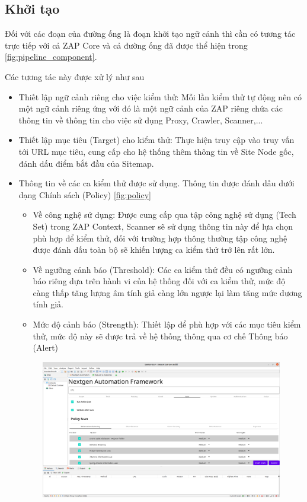 \documentclass[./../main.tex]{subfiles}
\begin{document}
\subsection{Khởi tạo}

Đối với các đoạn của đường ống là đoạn khởi tạo ngữ cảnh thì cần có tương
tác trực tiếp với cả ZAP Core và cả đường ống đã được thể hiện trong \ref{fig:pipeline_component}.

Các tương tác này được xử lý như sau
\begin{itemize}
	\item Thiết lập ngữ cảnh riêng cho việc kiểm thử: Mỗi lần kiểm
	      thử tự động nên có một ngữ cảnh riêng ứng với đó là một ngữ cảnh
	      của ZAP riêng chứa các thông tin về thông tin cho việc sử dụng
	      Proxy, Crawler, Scanner,...
	\item Thiết lập mục tiêu (Target) cho kiểm thử: Thực hiện truy cập
	      vào truy vấn tới URL mục tiêu, cung cấp cho hệ thống thêm thông tin
	      về Site Node gốc, đánh dấu điểm bắt đầu của Sitemap.
	\item Thông tin về các ca kiểm thử được sử dụng. Thông tin được
	      đánh dấu dưới dạng Chính sách (Policy) \ref{fig:policy}
	      \begin{itemize}
		      \item Về công nghệ sử dụng: Được cung cấp qua tập công
		            nghệ sử dụng (Tech Set) trong ZAP Context, Scanner sẽ
		            sử dụng thông tin này để lựa chọn phù hợp để kiểm thử,
		            đối với trường hợp thông thường tập công nghệ được
		            đánh dấu toàn bộ sẽ khiến lượng ca kiểm thử trở lên rất lớn.
		      \item Về ngưỡng cảnh báo (Threshold): Các ca kiểm thử đều có ngưỡng
		            cảnh báo riêng dựa trên hành vi của hệ thống đối với ca
		            kiểm thử, mức độ càng thấp tăng lượng âm tính giả càng
		            lớn ngược lại làm tăng mức dương tính giả.
		      \item Mức độ cảnh báo (Strength): Thiết lập để phù hợp với các mục
		            tiêu kiểm thử, mức độ này sẽ được trả về hệ thống thông
		            qua cơ chế Thông báo (Alert)
	      \end{itemize}
	      \begin{figure}[ht!]
		      \includegraphics[width=\linewidth]{./images/policy.png}

\end{figure}
\end{itemize}
\end{document}
